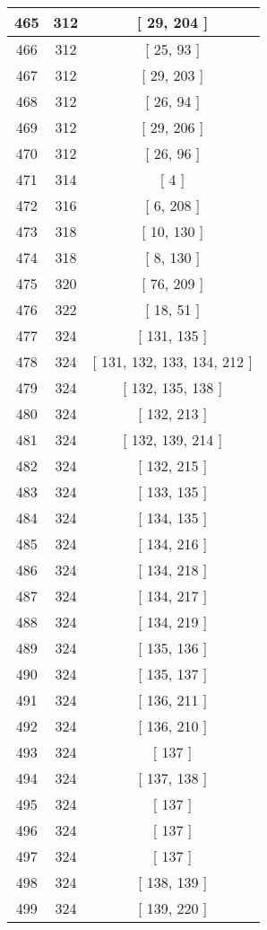 \begin{center}
\begin{longtable}[H]{|| c c c ||}
\hline
465 & 312 & [ 29, 204 ] \\ 
\hline
466 & 312 & [ 25, 93 ] \\ 
\hline
467 & 312 & [ 29, 203 ] \\ 
\hline
468 & 312 & [ 26, 94 ] \\ 
\hline
469 & 312 & [ 29, 206 ] \\ 
\hline
470 & 312 & [ 26, 96 ] \\ 
\hline
471 & 314 & [ 4 ] \\ 
\hline
472 & 316 & [ 6, 208 ] \\ 
\hline
473 & 318 & [ 10, 130 ] \\ 
\hline
474 & 318 & [ 8, 130 ] \\ 
\hline
475 & 320 & [ 76, 209 ] \\ 
\hline
476 & 322 & [ 18, 51 ] \\ 
\hline
477 & 324 & [ 131, 135 ] \\ 
\hline
478 & 324 & [ 131, 132, 133, 134, 212 ] \\ 
\hline
479 & 324 & [ 132, 135, 138 ] \\ 
\hline
480 & 324 & [ 132, 213 ] \\ 
\hline
481 & 324 & [ 132, 139, 214 ] \\ 
\hline
482 & 324 & [ 132, 215 ] \\ 
\hline
483 & 324 & [ 133, 135 ] \\ 
\hline
484 & 324 & [ 134, 135 ] \\ 
\hline
485 & 324 & [ 134, 216 ] \\ 
\hline
486 & 324 & [ 134, 218 ] \\ 
\hline
487 & 324 & [ 134, 217 ] \\ 
\hline
488 & 324 & [ 134, 219 ] \\ 
\hline
489 & 324 & [ 135, 136 ] \\ 
\hline
490 & 324 & [ 135, 137 ] \\ 
\hline
491 & 324 & [ 136, 211 ] \\ 
\hline
492 & 324 & [ 136, 210 ] \\ 
\hline
493 & 324 & [ 137 ] \\ 
\hline
494 & 324 & [ 137, 138 ] \\ 
\hline
495 & 324 & [ 137 ] \\ 
\hline
496 & 324 & [ 137 ] \\ 
\hline
497 & 324 & [ 137 ] \\ 
\hline
498 & 324 & [ 138, 139 ] \\ 
\hline
499 & 324 & [ 139, 220 ] \\ 

\end{longtable}
\end{center}
